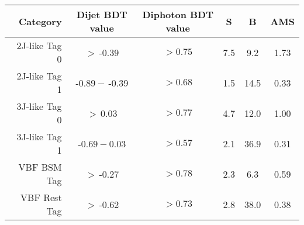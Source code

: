 \begin{tabular}{ r | c | c | c | c | c } 
\hline 
Category       & Dijet BDT value & Diphoton BDT value & S & B & AMS \\ 
\hline 
2J-like  Tag 0 & $>\,$-0.39        & $ > 0.75$            & 7.5    & 9.2        & 1.73         \\
2J-like  Tag 1 & -$0.89 -\,$-0.39  & $ > 0.68$            & 1.5    & 14.5       & 0.33         \\
3J-like  Tag 0 & $>\,$0.03         & $ > 0.77$            & 4.7    & 12.0       & 1.00         \\
3J-like  Tag 1 & -$0.69 - 0.03$    & $ > 0.57$            & 2.1    & 36.9       & 0.31         \\
VBF BSM Tag    & $ >\,$-0.27       & $ > 0.78$            & 2.3    & 6.3        & 0.59         \\
VBF Rest Tag   & $ >\,$-0.62       & $ > 0.73$            & 2.8    & 38.0       & 0.38         \\
\hline 
\end{tabular}
